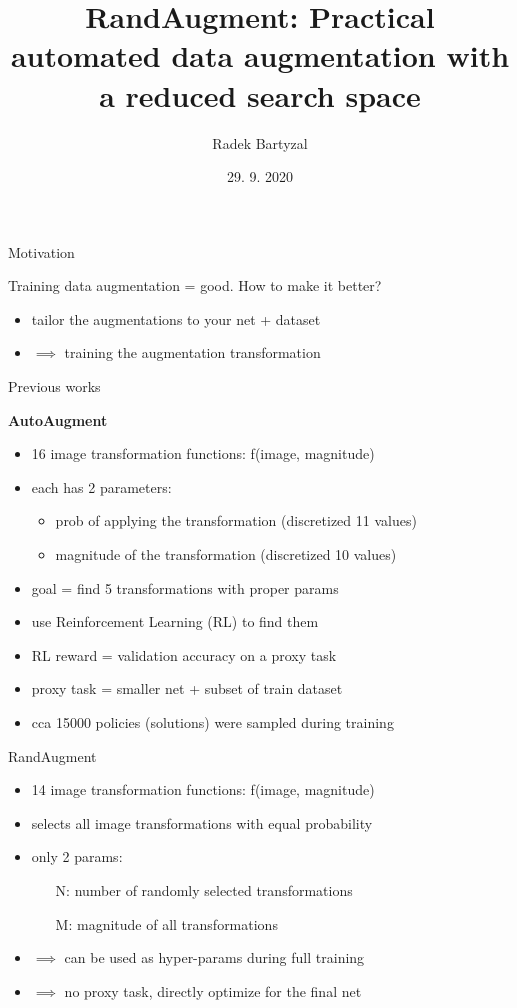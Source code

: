 \documentclass{beamer}
\begin{document}
\title[RandAugment]{RandAugment: Practical automated data augmentation with a reduced search space}  
\author{Radek Bartyzal}
\date{29. 9. 2020} 

\frame{\titlepage} 

\begin{frame}{Motivation}

Training data augmentation = good.
\vfill
How to make it better?

\begin{itemize}
\item tailor the augmentations to your net + dataset
\item $\implies$ training the augmentation transformation 
\end{itemize}

\end{frame}
\begin{frame}{Previous works}

\textbf{AutoAugment} \cite{cit:auto}
\begin{itemize}
\item 16 image transformation functions: f(image, magnitude)
\item each has 2 parameters:
\begin{itemize}
\item prob of applying the transformation (discretized 11 values)
\item magnitude of the transformation (discretized 10 values)
\end{itemize}
\item goal = find 5 transformations with proper params
\item use Reinforcement Learning (RL) to find them
\item RL reward = validation accuracy on a proxy task
\item proxy task = smaller net + subset of train dataset
\item cca 15000 policies (solutions) were sampled during training
\end{itemize}
\end{frame}
\begin{frame}{RandAugment}

\begin{itemize}
\item 14 image transformation functions: f(image, magnitude)
\item selects all image transformations with
equal probability
\item only 2 params:
\begin{itemize}
\item[N:] number of randomly selected transformations
\item[M:] magnitude of all transformations
\end{itemize}
\item $\implies$ can be used as hyper-params during full training
\item $\implies$ no proxy task, directly optimize for the final net
\end{itemize}


\end{frame}
\end{document}
